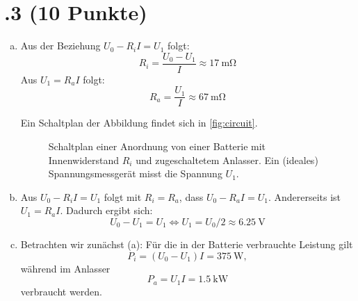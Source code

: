 \section*{\nr.3 \titthree (10 Punkte)}
\begin{enumerate}[(a)]
\item
Aus der Beziehung $U_0 - R_i I = U_1$ folgt:
\begin{equation}
R_i = \frac{U_0-U_1}{I} \approx \SI{17}{\milli\ohm}
\end{equation}
Aus $U_1=R_a I$ folgt:
\begin{equation}
R_a = \frac{U_1}{I} \approx \SI{67}{\milli\ohm}
\end{equation}

Ein Schaltplan der Abbildung findet sich in \vref{fig:circuit}.
\begin{figure}[htbp]
\centering
{}
\caption{Schaltplan einer Anordnung von einer Batterie mit Innenwiderstand $R_i$ und zugeschaltetem Anlasser. Ein (ideales) Spannungsmessgerät misst die Spannung $U_1$.}
\label{fig:circuit}
\end{figure}

\item Aus $U_0-R_i I = U_1$ folgt mit $R_i=R_a$, dass $U_0-R_a I = U_1$. Andererseits ist $U_1 = R_a I$. Dadurch ergibt sich:
\begin{equation}
U_0 - U_1 = U_1 \iff U_1 = U_0 /2 \approx \SI{6.25}{\volt}
\end{equation}

\item

Betrachten wir zunächst (a): Für die in der Batterie verbrauchte Leistung gilt
\begin{equation}
P_i = (U_0-U_1)I = \SI{375}{\watt},
\end{equation}
während im Anlasser
\begin{equation}
P_a = U_1 I = \SI{1.5}{\kilo\watt}
\end{equation}
verbraucht werden.


\end{enumerate}

